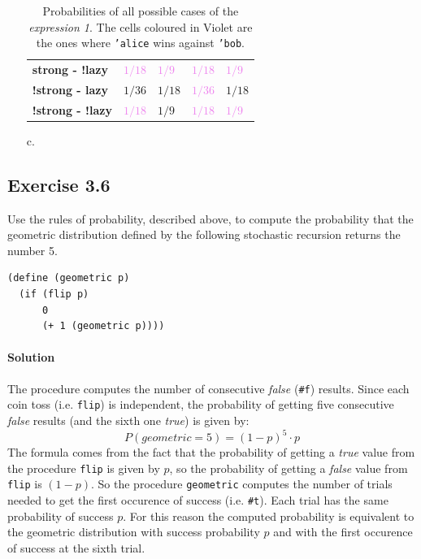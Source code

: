 \begin{itemize}
\begin{table}[H]
\begin{tabular}{| l | C{1.8cm} C{1.8cm} C{1.8cm} C{1.8cm}  |}
                    \textbf{strong - !lazy} & \textcolor{Violet}{$1/18$} & \textcolor{Violet}{$1/9$} & 
                        \textcolor{Violet}{$1/18$} & \textcolor{Violet}{$1/9$} \\ 
                    
                    \textbf{!strong - lazy} & \textcolor{RedOrange}{$1/36$} & \textcolor{RedOrange}{$1/18$} & 
                        \textcolor{Violet}{$1/36$} & \textcolor{RedOrange}{$1/18$} \\ 
                    
                    \textbf{!strong - !lazy} & \textcolor{Violet}{$1/18$} & \textcolor{RedOrange}{$1/9$} & 
                        \textcolor{Violet}{$1/18$} & \textcolor{Violet}{$1/9$} \\
                    \hline
                \end{tabular}
            \egroup
            \caption{
                Probabilities of all possible cases of the \textit{expression 1}. The cells coloured in Violet are the ones where
                \texttt{'alice} wins against \texttt{'bob}.
            }
            \label{tab:exp-1}
        \end{table}
     
    \item[c.]  
\end{itemize}

\subsection*{Exercise 3.6}
Use the rules of probability, described above, to compute the probability that the geometric distribution 
defined by the following stochastic recursion returns the number 5.

\begin{lstlisting}
(define (geometric p)
  (if (flip p)
      0
      (+ 1 (geometric p))))
\end{lstlisting}

\paragraph{Solution}
The procedure computes the number of consecutive \textit{false} (\texttt{\#f}) results. Since each coin toss (i.e. \texttt{flip}) is 
independent, the probability of getting five consecutive \textit{false} results (and the sixth one \textit{true}) is given by:
\[ P(geometric = 5) = (1 - p)^{5} \cdot p \]
The formula comes from the fact that the probability of getting a \textit{true} value from the procedure \texttt{flip} is given by
$p$, so the probability of getting a \textit{false} value from \texttt{flip} is $ (1 - p) $.
So the procedure \texttt{geometric} computes the number of trials needed to get the first occurence of success (i.e. \texttt{\#t}).
Each trial has the same probability of success $p$.
For this reason the computed probability is equivalent to the geometric distribution with success probability $p$ and with the 
first occurence of success at the sixth trial.

